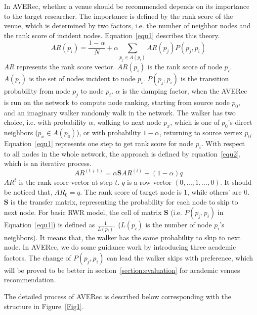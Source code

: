 \documentclass[9pt]{acm_proc_article-sp}
\begin{document}
In AVERec, whether a venue should be recommended depends on its importance to the target researcher. The importance is defined by the rank score of the venue, which is determined by two factors, i.e. the number of neighbor nodes and the rank score of incident nodes. Equation~\ref{equ1} describes this theory.
\begin{equation}
\label{equ1}
AR(p_{i})=\frac{1-\alpha}{N}+\alpha \sum_{p_{j}\in A(p_{i})}AR(p_{j})P(p_{j},p_{i})
\end{equation}
$AR$ represents the rank score vector. $AR(p_{i})$ is the rank score of node $p_{i}$. $A(p_{i})$ is the set of nodes incident to node $p_{i}$. $P(p_{j},p_{i})$ is the transition probability from node $p_{j}$ to node $p_{i}$. $\alpha$ is the damping factor, when the AVERec is run on the network to compute node ranking, starting from source node $p_{0}$, and an imaginary walker randomly walk in the network. The walker has two choice, i.e. with probability $\alpha$, walking to next node $p_{x}$, which is one of $p_{0}$'s direct neighbors ($p_{x}\in A(p_{0})$), or with probability $1-\alpha$, returning to source vertex $p_{0}$. Equation~\ref{equ1} represents one step to get rank score for node $p_{i}$. With respect to all nodes in the whole network, the approach is defined by equation~\ref{equ2}, which is an iterative process.
\begin{equation}
\label{equ2}
AR^{(t+1)}=\alpha \mathbf{S}AR^{(t)}+(1-\alpha)q
\end{equation}
$AR^{t}$ is the rank score vector at step $t$. $q$ is a row vector $(0,...,1,...,0)$. It should be noticed that, $AR_{0}=q$. The rank score of target node is $1$, while others' are $0$. $\mathbf{S}$ is the transfer matrix, representing the probability for each node to skip to next node. For basic RWR model, the cell of matrix $\mathbf{S}$ (i.e. $P(p_{j},p_{i})$ in Equation~\ref{equ1}) is defined as $\frac{1}{L(p_{i})}$. ($L(p_{i})$ is the number of node $p_{i}$'s neighbors). It means that, the walker has the same probability to skip to next node. In AVERec, we do some guidance work by introducing three academic factors. The change of $P(p_{j},p_{i})$ can lead the walker skips with preference, which will be proved to be better in section~\ref{section:evaluation} for academic venues recommendation.

The detailed process of AVERec is described below corresponding with the structure in Figure~\ref{Fig1}.
\end{document}
